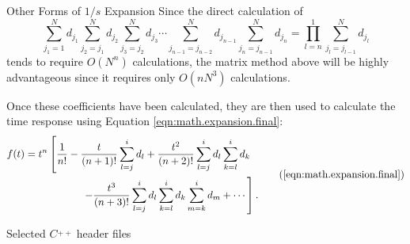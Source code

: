 \begin{chapter}{Other Forms  of $1/s$ Expansion\label{app:math.1_s}}
  Since the direct calculation of
  \begin{equation}
    \sum_{j_1=1}^N d_{j_1} \sum_{j_{2}=j_1}^N d_{j_{2}}
        \sum_{j_{3}=j_2}^N d_{j_{3}} \cdots \sum_{j_{n-1}=j_{n-2}}^N
        d_{j_{n-1}}\sum_{j_n=j_{n-1}}^N d_{j_n} =
        \prod_{l=n}^1\sum_{j_l=j_{l-1}}^Nd_{j_l}
  \end{equation}
  tends to require $O(N^n)$ calculations, the matrix method above will
  be highly advantageous since it requires only $O(nN^3)$
  calculations.
  
  Once these coefficients have been calculated, they are then used to
  calculate the time response using Equation
  \ref{eqn:math.expansion.final}:
  \begin{equation}
    \begin{split}
      f(t) &= t^{n} \left[ \frac{1}{n!} - \frac{t}{(n+1)!}\sum_{l=j}^i d_l 
                           +\frac{t^2}{(n+2)!}\sum_{l=j}^{i}d_l \sum_{k=l}^i d_k\right.\\  
           &\phantom{= t^{n-1} \left[\right.}
                    \left.\quad\quad-\frac{t^3}{(n+3)!}\sum_{l=j}^{i}d_l \sum_{k=l}^i d_k \sum_{m=k}^i d_m 
                          +\cdots \right ].\\
    \end{split}\tag{\ref{eqn:math.expansion.final}}
  \end{equation}

\end{chapter}


 


\begin{chapter}{Selected  $C\!\!\!\stackrel{+\!\!+}{}$ header files}
  \label{app:headers}

\end{chapter}

